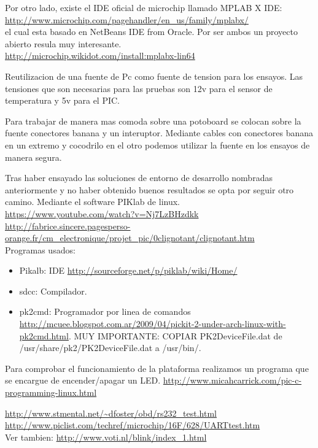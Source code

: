 Por otro lado, existe el IDE oficial de microchip llamado MPLAB X IDE:\\
\url{http://www.microchip.com/pagehandler/en_us/family/mplabx/}\\
el cual esta basado en NetBeans IDE from Oracle. Por ser ambos un proyecto
abierto resula muy interesante.\\
\url{http://microchip.wikidot.com/install:mplabx-lin64}



Reutilizacion de una fuente de Pc como fuente de tension para los ensayos.
Las tensiones que son necesarias para las pruebas son 12v para el sensor de 
temperatura y 5v para el PIC.

Para trabajar de manera mas comoda sobre una potoboard se colocan sobre la 
fuente conectores banana y un interuptor. Mediante cables con conectores 
banana en un extremo y cocodrilo en el otro podemos utilizar la fuente en
los ensayos de manera segura.

Tras haber ensayado las soluciones de entorno de desarrollo nombradas anteriormente
y no haber obtenido buenos resultados se opta por seguir otro camino.
Mediante el software PIKlab de linux.\\
\url{https://www.youtube.com/watch?v=Nj7LzBHzdkk}\\
\url{http://fabrice.sincere.pagesperso-orange.fr/cm_electronique/projet_pic/0clignotant/clignotant.htm}\\
Programas usados:\\
\begin{itemize}
 \item Pikalb: IDE \url{http://sourceforge.net/p/piklab/wiki/Home/}
 \item sdcc: Compilador.
 \item pk2cmd: Programador por linea de comandos \url{http://mcuee.blogspot.com.ar/2009/04/pickit-2-under-arch-linux-with-pk2cmd.html}.
 MUY IMPORTANTE: COPIAR PK2DeviceFile.dat de /usr/share/pk2/PK2DeviceFile.dat a /usr/bin/. 
\end{itemize}

Para comprobar el funcionamiento de la plataforma realizamos un programa que se
encargue de encender/apagar un LED.
\url{http://www.micahcarrick.com/pic-c-programming-linux.html}

\url{http://www.stmental.net/~dfoster/obd/rs232_test.html}\\
\url{http://www.piclist.com/techref/microchip/16F/628/UARTtest.htm}\\
Ver tambien:
\url{http://www.voti.nl/blink/index_1.html}\\

